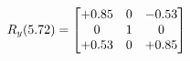 \documentclass[preview]{standalone}
\begin{document}
\begin{align*}
\special{dvisvgm:raw <g id='unique000'>}R_{y}(5.72) = \begin{bmatrix}+0.85 & 0 & -0.53 \\0 & 1 & 0 \\+0.53 & 0 & +0.85\end{bmatrix}\special{dvisvgm:raw </g>}
\end{align*}
\end{document}
